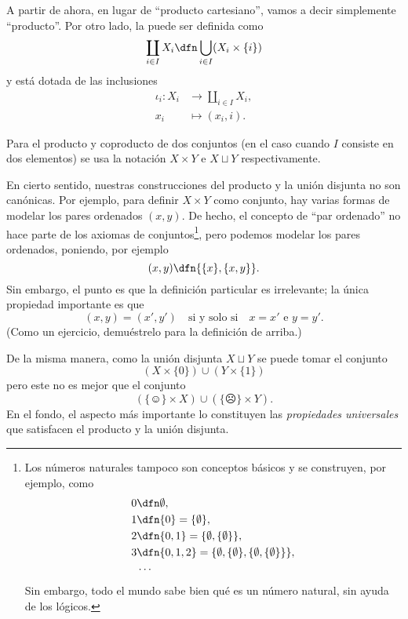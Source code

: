 A partir de ahora, en lugar de ``producto cartesiano'', vamos a decir
simplemente ``producto''. Por otro lado, la  puede ser definida como
\begin{equation}
  \label{eqn:union-disjunta}
  \coprod_{i\in I} X_i \dfn \bigcup_{i\in I} (X_i \times \{ i \})
\end{equation}
y está dotada de las inclusiones
\begin{align*}
  \iota_i\colon X_i & \to \coprod_{i\in I} X_i,\\
  x_i & \mapsto (x_i,i).
\end{align*}

Para el producto y coproducto de dos conjuntos (en el caso cuando $I$ consiste
en dos elementos) se usa la notación $X\times Y$ e $X\sqcup Y$ respectivamente.

En cierto sentido, nuestras construcciones del producto y la unión disjunta no
son canónicas. Por ejemplo, para definir $X\times Y$ como conjunto, hay varias
formas de modelar los pares ordenados $(x,y)$. De hecho, el concepto de
``par ordenado'' no hace parte de los axiomas de conjuntos\footnote{Los números
  naturales tampoco son conceptos básicos y se construyen, por ejemplo, como
\begin{align*}
  0 & \dfn \emptyset,\\
  1 & \dfn \{0\} = \{\emptyset \},\\
  2 & \dfn \{0,1\} = \{\emptyset ,\{\emptyset \}\},\\
  3 & \dfn \{0,1,2\}=\{\emptyset ,\{\emptyset \},\{\emptyset ,\{\emptyset \}\}\},\\
    & \cdots
\end{align*}
Sin embargo, todo el mundo sabe bien qué es un número natural, sin ayuda de los
lógicos.}, pero podemos modelar los pares ordenados, poniendo, por ejemplo
$$(x,y) \dfn \{\{x\}, \{x,y\}\}.$$
Sin embargo, el punto es que la definición particular es irrelevante; la única
propiedad importante es que
$$(x,y) = (x',y') \quad \text{si y solo si}\quad x=x'\text{ e }y=y'.$$
(Como un ejercicio, demuéstrelo para la definición de arriba.)

De la misma manera, como la unión disjunta $X\sqcup Y$ se puede tomar el
conjunto
$$(X\times \{ 0 \}) \cup (Y\times \{ 1 \})$$
pero este no es mejor que el conjunto
$$(\{ \smiley \}\times X) \cup (\{ \frownie \}\times Y).$$
En el fondo, el aspecto más importante lo constituyen las
\emph{propiedades universales} que satisfacen el producto y la unión disjunta.

